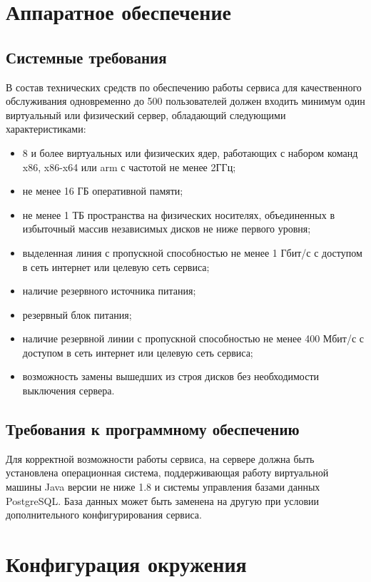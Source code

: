 \section{Аппаратное обеспечение}
\subsection{Системные требования}
В состав технических средств по обеспечению работы сервиса для качественного обслуживания одновременно до 500 пользователей должен входить минимум один виртуальный или физический сервер, обладающий следующими характеристиками:

\begin{itemize}
  \item 8 и более виртуальных или физических ядер, работающих с набором команд x86, x86-x64 или arm с частотой не менее 2ГГц;
  \item не менее 16 ГБ оперативной памяти;
  \item не менее 1 ТБ пространства на физических носителях, объединенных в избыточный массив независимых дисков не ниже первого уровня;
  \item выделенная линия с пропускной способностью не менее 1 Гбит/с с доступом в сеть интернет или целевую сеть сервиса;
  \item наличие резервного источника питания;
  \item резервный блок питания;
  \item наличие резервной линии с пропускной способностью не менее 400 Мбит/с с доступом в сеть интернет или целевую сеть сервиса;
  \item возможность замены вышедших из строя дисков без необходимости выключения сервера.
\end{itemize}

\subsection{Требования к программному обеспечению}
Для корректной возможности работы сервиса, на сервере должна быть установлена операционная система, поддерживающая работу виртуальной машины Java версии не ниже 1.8 и системы управления базами данных PostgreSQL. База данных может быть заменена на другую при условии дополнительного конфигурирования сервиса. 

\section{Конфигурация окружения}


